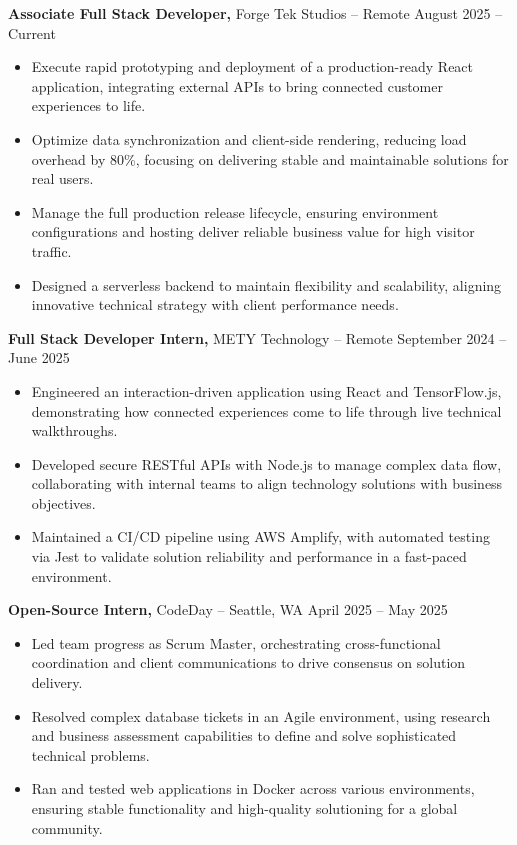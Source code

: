 \documentclass[11pt]{article}       %
\begin{document}
\textbf{Associate Full Stack Developer,} {Forge Tek Studios} -- Remote \hfill August 2025 -- Current 
\vspace{-9pt}
\begin{itemize}
  \item Execute rapid prototyping and deployment of a production-ready React application, integrating external APIs to bring connected customer experiences to life.
  \item Optimize data synchronization and client-side rendering, reducing load overhead by 80\%, focusing on delivering stable and maintainable solutions for real users.
  \item Manage the full production release lifecycle, ensuring environment configurations and hosting deliver reliable business value for high visitor traffic.
  \item Designed a serverless backend to maintain flexibility and scalability, aligning innovative technical strategy with client performance needs.
\end{itemize}

\textbf{Full Stack Developer Intern,} {METY Technology} -- Remote \hfill September 2024 -- June 2025 
\vspace{-9pt}
\begin{itemize}
  \item Engineered an interaction-driven application using React and TensorFlow.js, demonstrating how connected experiences come to life through live technical walkthroughs.
  \item Developed secure RESTful APIs with Node.js to manage complex data flow, collaborating with internal teams to align technology solutions with business objectives.
  \item Maintained a CI/CD pipeline using AWS Amplify, with automated testing via Jest to validate solution reliability and performance in a fast-paced environment.
\end{itemize}

\textbf{Open-Source Intern,} {CodeDay} -- Seattle, WA \hfill April 2025 -- May 2025 \\
\vspace{-9pt}
\begin{itemize}
  \item Led team progress as Scrum Master, orchestrating cross-functional coordination and client communications to drive consensus on solution delivery.
  \item Resolved complex database tickets in an Agile environment, using research and business assessment capabilities to define and solve sophisticated technical problems.
  \item Ran and tested web applications in Docker across various environments, ensuring stable functionality and high-quality solutioning for a global community.
\end{itemize}
\end{document}
